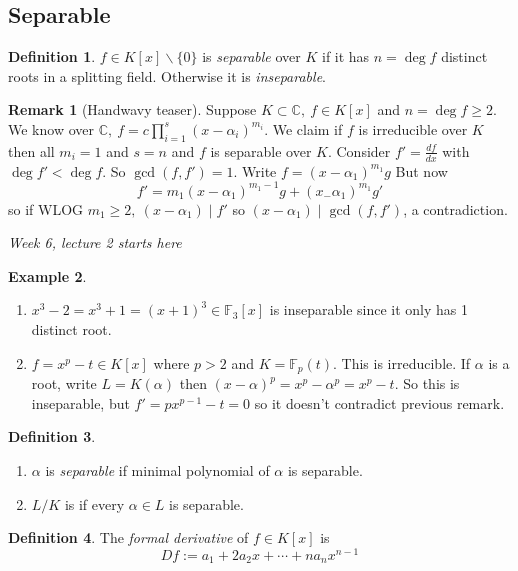 \documentclass[a4paper]{article}
\newcommand{\C}{\mathbb C}
\theoremstyle{definition}
\newtheorem{defn}{Definition}[subsection]
\newtheorem{example}[defn]{Example}
\newtheorem*{remark}{Remark}
\begin{document}
\subsection{Separable}
\begin{defn}
$f\in K[x]\backslash \{0\}$ is \textit{separable} over $K$ if it has $n=\deg f$ distinct roots in a splitting field. Otherwise it is \textit{inseparable}.
\end{defn}

\begin{remark}[Handwavy teaser]
Suppose $K\subset \C,\ f\in K[x]$ and $n=\deg f \geq 2$. We know over $\C,\ f=c\prod_{i=1}^s (x-\alpha_i)^{m_i}$. We claim if $f$ is irreducible over $K$ then all $m_i=1$ and $s=n$ and $f$ is separable over $K$. Consider $f'=\frac{df}{dx}$ with $\deg f'<\deg f$. So $\gcd (f,f')=1$. Write $f=(x-\alpha_1)^{m_1}g$ But now 
\[
f'=m_1(x-\alpha_1)^{m_1-1} g + (x_-\alpha_1)^{m_1} g'
\]
so if WLOG $m_1\geq 2,\ (x-\alpha_1)\mid f'$ so $(x-\alpha_1)\mid \gcd (f,f')$, a contradiction.
\end{remark}

\begin{flushright}
\textit{Week 6, lecture 2 starts here}
\end{flushright}

\begin{example}
\begin{enumerate}
\item $x^3-2=x^3+1=(x+1)^3\in \mathbb F_3[x]$ is inseparable since it only has 1 distinct root.
\item $f=x^p-t\in K[x]$ where $p>2$ and $K=\mathbb F_p(t)$. This is irreducible. If $\alpha$ is a root, write $L=K(\alpha)$ then $(x-\alpha)^p=x^p-\alpha^p=x^p-t$. So this is inseparable, but $f'=px^{p-1}-t=0$ so it doesn't contradict previous remark.
\end{enumerate}
\end{example}

\begin{defn}
\begin{enumerate}
\item $\alpha$ is \textit{separable} if minimal polynomial of $\alpha$ is separable.
\item $L/K$ is  if every $\alpha\in L$ is separable.
\end{enumerate}
\end{defn}

\begin{defn}
The \textit{formal derivative} of $f\in K[x]$ is
\[
Df:=a_1+2a_2x+\cdots+na_nx^{n-1}
\]
\end{defn}
\end{document}

